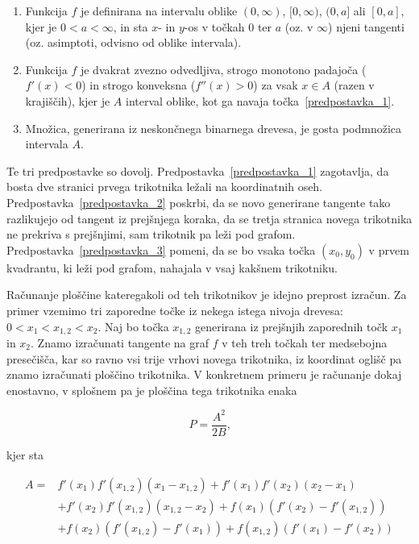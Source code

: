 \documentclass[a4paper, 12pt, titlepage]{article}
\begin{document}
\begin{enumerate}
    \item \label{predpostavka_1} Funkcija $ f $ je definirana na intervalu oblike $(0, \infty)$, $[0,\infty)$, $(0,a]$ ali $[0,a]$, kjer je $ 0 < a < \infty $, in sta $x$- in $y$-os v točkah 0 ter $a$ (oz. v $ \infty $) njeni tangenti (oz. asimptoti, odvisno od oblike intervala).
    \item \label{predpostavka_2} Funkcija $ f $ je dvakrat zvezno odvedljiva, strogo monotono padajoča ($ f'(x) < 0 $) in strogo konveksna ($ f''(x) > 0 $) za vsak $ x \in A$ (razen v krajiščih), kjer je $ A $ interval oblike, kot ga navaja točka~\ref{predpostavka_1}.
    \item \label{predpostavka_3} Množica, generirana iz neskončnega binarnega drevesa, je gosta podmnožica intervala $ A $.
\end{enumerate}

Te tri predpostavke so dovolj. Predpostavka~\ref{predpostavka_1} zagotavlja, da bosta dve stranici prvega trikotnika ležali na koordinatnih oseh. Predpostavka~\ref{predpostavka_2} poskrbi, da se novo generirane tangente tako razlikujejo od tangent iz prejšnjega koraka, da se tretja stranica novega trikotnika ne prekriva s prejšnjimi, sam trikotnik pa leži pod grafom. Predpostavka~\ref{predpostavka_3} pomeni, da se bo vsaka točka $ (x_0, y_0) $ v prvem kvadrantu, ki leži pod grafom, nahajala v vsaj kakšnem trikotniku.

Računanje ploščine kateregakoli od teh trikotnikov je idejno preprost izračun. Za primer vzemimo tri zaporedne točke iz nekega istega nivoja drevesa: $ 0 < x_1 < x_{1,2} < x_2 $. Naj bo točka $ x_{1,2} $ generirana iz prejšnjih zaporednih točk $ x_1 $ in $ x_2 $. Znamo izračunati tangente na graf $ f $ v teh treh točkah ter medsebojna presečišča, kar so ravno vsi trije vrhovi novega trikotnika, iz koordinat oglišč pa znamo izračunati ploščino trikotnika. V konkretnem primeru je računanje dokaj enostavno, v splošnem pa je ploščina tega trikotnika enaka 

\begin{equation}
    \label{splosna_ploscina_formula}
    P = \frac{A^2}{2B}\text{,}
\end{equation}

kjer sta

\begin{align*}
    A =  &f'(x_1)f'(x_{1,2})(x_1 - x_{1,2}) + f'(x_1)f'(x_2)(x_2 - x_1) \\
&+ f'(x_2)f'(x_{1,2})(x_{1,2} - x_2) + f(x_1)(f'(x_2) - f'(x_{1,2})) \\
&+ f(x_2)(f'(x_{1,2}) - f'(x_1)) + f(x_{1,2})(f'(x_1) - f'(x_2))
\end{align*}
\end{document}
